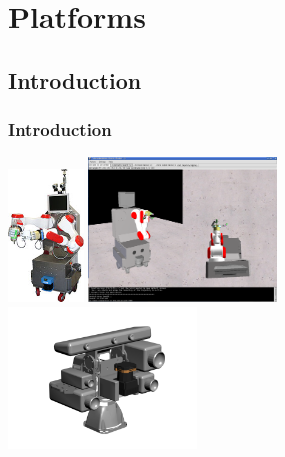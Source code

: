 \section{Platforms}
\subsection{Introduction}
\begin{frame}
  \frametitle{Introduction}
\includegraphics[width=2cm]{images/taser.jpg}
\hspace{5ex}
\includegraphics[width=5cm]{images/TASER_simulator1.png} \\[0cm]
\vspace{-6ex}
\hspace{33ex}\includegraphics[width=5cm]{images/ActivePerceptionStereoHead_Top_Front.png}
\end{frame}


